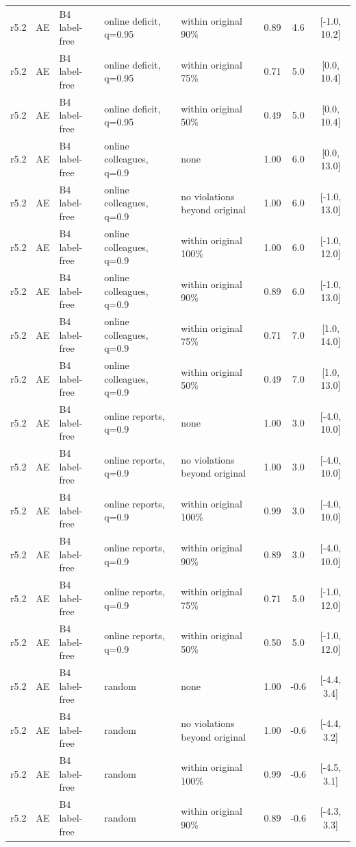 \documentclass[10pt,onecolumn,letterpaper]{article}
\begin{document}
\begin{longtable}{lllp{4.2cm}p{3.4cm}ccc}
r5.2 & AE & B4 label-free & online deficit, q=0.95 & within original 90\% & 0.89 & 4.6 & [-1.0, 10.2] \\
r5.2 & AE & B4 label-free & online deficit, q=0.95 & within original 75\% & 0.71 & 5.0 & [0.0, 10.4] \\
r5.2 & AE & B4 label-free & online deficit, q=0.95 & within original 50\% & 0.49 & 5.0 & [0.0, 10.4] \\
r5.2 & AE & B4 label-free & online colleagues, q=0.9 & none & 1.00 & 6.0 & [0.0, 13.0] \\
r5.2 & AE & B4 label-free & online colleagues, q=0.9 & no violations beyond original & 1.00 & 6.0 & [-1.0, 13.0] \\
r5.2 & AE & B4 label-free & online colleagues, q=0.9 & within original 100\% & 1.00 & 6.0 & [-1.0, 12.0] \\
r5.2 & AE & B4 label-free & online colleagues, q=0.9 & within original 90\% & 0.89 & 6.0 & [-1.0, 13.0] \\
r5.2 & AE & B4 label-free & online colleagues, q=0.9 & within original 75\% & 0.71 & 7.0 & [1.0, 14.0] \\
r5.2 & AE & B4 label-free & online colleagues, q=0.9 & within original 50\% & 0.49 & 7.0 & [1.0, 13.0] \\
r5.2 & AE & B4 label-free & online reports, q=0.9 & none & 1.00 & 3.0 & [-4.0, 10.0] \\
r5.2 & AE & B4 label-free & online reports, q=0.9 & no violations beyond original & 1.00 & 3.0 & [-4.0, 10.0] \\
r5.2 & AE & B4 label-free & online reports, q=0.9 & within original 100\% & 0.99 & 3.0 & [-4.0, 10.0] \\
r5.2 & AE & B4 label-free & online reports, q=0.9 & within original 90\% & 0.89 & 3.0 & [-4.0, 10.0] \\
r5.2 & AE & B4 label-free & online reports, q=0.9 & within original 75\% & 0.71 & 5.0 & [-1.0, 12.0] \\
r5.2 & AE & B4 label-free & online reports, q=0.9 & within original 50\% & 0.50 & 5.0 & [-1.0, 12.0] \\
r5.2 & AE & B4 label-free & random & none & 1.00 & -0.6 & [-4.4, 3.4] \\
r5.2 & AE & B4 label-free & random & no violations beyond original & 1.00 & -0.6 & [-4.4, 3.2] \\
r5.2 & AE & B4 label-free & random & within original 100\% & 0.99 & -0.6 & [-4.5, 3.1] \\
r5.2 & AE & B4 label-free & random & within original 90\% & 0.89 & -0.6 & [-4.3, 3.3] \\

\end{longtable}
\end{document}

